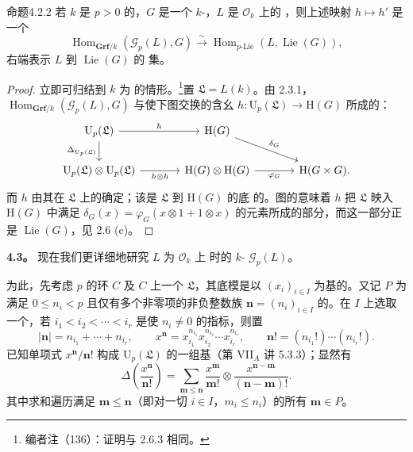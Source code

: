 \begin{SGAresult}{命题}{4.2.2}
若 $k$ 是 $p>0$ 的，$G$ 是一个 $k$-，$L$ 是 $\mathcal O_k$ 上的 ，则上述映射 $h\mapsto h'$ 是一个
\[
\operatorname{Hom}_{\mathbf{Grf}/k}(\mathscr G_p(L),G)
\xrightarrow{\sim}\operatorname{Hom}_{p\text{-}\mathrm{Lie}}(L,\operatorname{Lie}(G)),
\]
右端表示 $L$ 到 $\operatorname{Lie}(G)$ 的 集。
\end{SGAresult}
\begin{proof}
立即可归结到 $k$ 为 的情形。\footnote{编者注（136）：证明与 2.6.3 相同。}置 $\mathfrak L=L(k)$。由 2.3.1，$\operatorname{Hom}_{\mathbf{Grf}/k}(\mathscr G_p(L),G)$ 与使下图交换的含幺 $h:\mathrm U_p(\mathfrak L)\to\mathrm H(G)$ 所成的：
\[
\begin{tikzcd}[column sep=large]
\mathrm U_p(\mathfrak L)\arrow[r,"h"]\arrow[d,"\Delta_{\mathrm U_p(\mathfrak L)}"']&\mathrm H(G)\arrow[dr,"\delta_G"]&\\
\mathrm U_p(\mathfrak L)\otimes\mathrm U_p(\mathfrak L)\arrow[r,"h\otimes h"']&\mathrm H(G)\otimes\mathrm H(G)\arrow[r,"\varphi_G"']&\mathrm H(G\times G).
\end{tikzcd}
\]
而 $h$ 由其在 $\mathfrak L$ 上的确定；该是 $\mathfrak L$ 到 $\mathrm H(G)$ 的底 的。图的意味着 $h$ 把 $\mathfrak L$ 映入 $\mathrm H(G)$ 中满足 $\delta_G(x)=\varphi_G(x\otimes1+1\otimes x)$ 的元素所成的部分，而这一部分正是 $\operatorname{Lie}(G)$，见 2.6 (c)。
\end{proof}

\textbf{4.3。} 现在我们更详细地研究 $L$ 为 $\mathcal O_k$ 上 时的 $k$- $\mathscr G_p(L)$。

为此，先考虑 $p$ 的环 $C$ 及 $C$ 上一个  $\mathfrak L$，其底模是以 $(x_i)_{i\in I}$ 为基的。又记 $P$ 为满足 $0\leq n_i<p$ 且仅有多个非零项的非负整数族 $\mathbf n=(n_i)_{i\in I}$ 的。在 $I$ 上选取一个，若 $i_1<i_2<\cdots<i_r$ 是使 $n_i\ne0$ 的指标，则置
\[
|\mathbf n|=n_{i_1}+\cdots+n_{i_r},\qquad
x^{\mathbf n}=x_{i_1}^{n_{i_1}}x_{i_2}^{n_{i_2}}\cdots x_{i_r}^{n_{i_r}},\qquad
\mathbf n!=(n_{i_1}!)\cdots(n_{i_r}!).
\]
已知单项式 $x^{\mathbf n}/\mathbf n!$ 构成 $\mathrm U_p(\mathfrak L)$ 的一组基（第 VII$_A$ 讲 5.3.3）；显然有
\[
\Delta\left(\frac{x^{\mathbf n}}{\mathbf n!}\right)
=\sum_{\mathbf m\leq\mathbf n}\frac{x^{\mathbf m}}{\mathbf m!}\otimes
\frac{x^{\mathbf n-\mathbf m}}{(\mathbf n-\mathbf m)!}.\tag{*}
\]
其中求和遍历满足 $\mathbf m\leq\mathbf n$（即对一切 $i\in I$，$m_i\leq n_i$）的所有 $\mathbf m\in P$。


